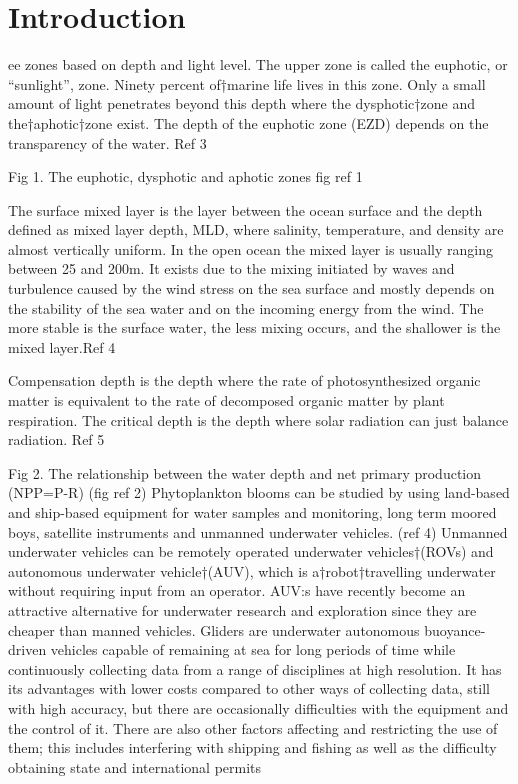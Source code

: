 \documentclass[../Main.tex]{subfiles}
\begin{document}
\section*{\crule[blue]{.3cm}{.3cm} Introduction}
ee zones based on depth and light level. The upper zone is called the euphotic, or ``sunlight'', zone. Ninety percent of†marine life lives in this zone. Only a small amount of light penetrates beyond this depth where the dysphotic†zone and the†aphotic†zone exist. The depth of the euphotic zone (EZD) depends on the transparency of the water. Ref 3


Fig 1. The euphotic, dysphotic and aphotic zones fig  ref 1

The surface mixed layer is the layer between the ocean surface and the depth defined as mixed layer depth, MLD, where salinity, temperature, and density are almost vertically uniform. In the open ocean the mixed layer is usually ranging between 25 and 200m. It exists due to the mixing initiated by waves and turbulence caused by the wind stress on the sea surface and mostly depends on the stability of the sea water and on the incoming energy from the wind. The more stable is the surface water, the less mixing occurs, and the shallower is the mixed layer.Ref 4



Compensation depth is the depth where the rate of photosynthesized organic matter is equivalent to the rate of decomposed organic matter by plant respiration. The critical depth is the depth where solar radiation can just balance radiation. Ref 5


Fig 2. The relationship between the water depth and net primary production (NPP=P-R) (fig ref 2)
Phytoplankton blooms can be studied by using land-based and ship-based equipment for water samples and monitoring, long term moored boys, satellite instruments and unmanned underwater vehicles. (ref 4)
Unmanned underwater vehicles can be remotely operated underwater vehicles†(ROVs) and autonomous underwater vehicle†(AUV), which is a†robot†travelling underwater without requiring input from an operator.  AUV:s have recently become an attractive alternative for underwater research and exploration since they are cheaper than manned vehicles.
Gliders are underwater autonomous buoyance-driven vehicles capable of remaining at sea for long periods of time while continuously collecting data from a range of disciplines at high resolution. It has its advantages with lower costs compared to other ways of collecting data, still with high accuracy, but there are occasionally difficulties with the equipment and the control of it. There are also other factors affecting and restricting the use of them; this includes interfering with shipping and fishing as well as the difficulty obtaining state and international permits
\end{document}
